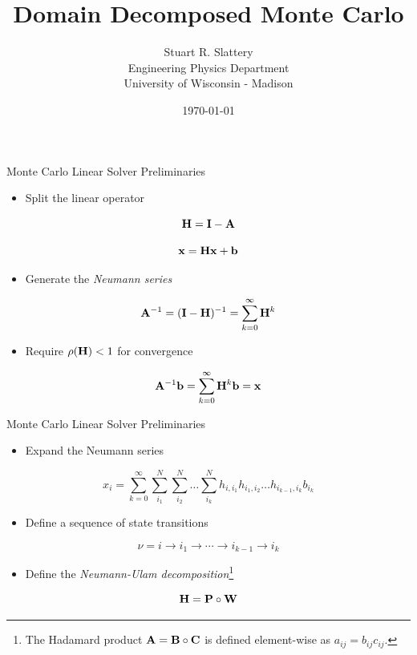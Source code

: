 \documentclass{beamer}
\author{Stuart R. Slattery
  \\ Engineering Physics Department
  \\ University of Wisconsin - Madison
}
\date{\today}
\title{Domain Decomposed Monte Carlo}
\begin{document}
\maketitle

\begin{frame}{Monte Carlo Linear Solver Preliminaries}

  \begin{itemize}
  \item Split the linear operator
  \end{itemize}

  \[
  \mathbf{H} = \mathbf{I} - \mathbf{A}
  \]

  \[
  \mathbf{x} = \mathbf{H} \mathbf{x} + \mathbf{b}
  \]

  \medskip
  \begin{itemize}
  \item Generate the \textit{Neumann series}
  \end{itemize}
  
  \[
  \mathbf{A}^{-1} = (\mathbf{I}-\mathbf{H})^{-1} = \sum_{k=0}^{\infty} \mathbf{H}^k
  \]

  \medskip
  \begin{itemize}
  \item Require $\rho(\mathbf{H}) < 1$ for convergence
  \end{itemize}

  \[
  \mathbf{A}^{-1}\mathbf{b} = \sum_{k=0}^{\infty} \mathbf{H}^k\mathbf{b} = \mathbf{x}
  \]

\end{frame}

\begin{frame}{Monte Carlo Linear Solver Preliminaries}

  \begin{itemize}
  \item Expand the Neumann series
  \end{itemize}

  \[
  x_i = \sum_{k=0}^{\infty}\sum_{i_1}^{N}\sum_{i_2}^{N}\ldots
  \sum_{i_k}^{N}h_{i,i_1}h_{i_1,i_2}\ldots h_{i_{k-1},i_k}b_{i_k}
  \]

  \medskip
  \begin{itemize}
  \item Define a sequence of state transitions
  \end{itemize}
  
  \[
  \nu = i \rightarrow i_1 \rightarrow \cdots \rightarrow i_{k-1}
  \rightarrow i_{k}
  \]

  \medskip
  \begin{itemize}
  \item Define the \textit{Neumann-Ulam decomposition}\footnote{The
    Hadamard product $\mathbf{A} = \mathbf{B} \circ \mathbf{C}$ is defined
    element-wise as $a_{ij} = b_{ij} c_{ij}$.}
  \end{itemize}

  \[
  \mathbf{H} = \mathbf{P} \circ \mathbf{W}
  \]

\end{frame}
\end{document}
